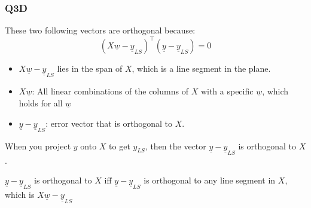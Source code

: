 \subsubsection{Q3D}
\begin{intuition}
    These two following vectors are orthogonal because:
    \[
    (X\underline{w} - \underline{y}_{LS})^\top (\underline{y} - \underline{y}_{LS}) = 0
    \]
    \begin{itemize}
        \item $X\underline{w} - \underline{y}_{LS}$ lies in the span of $X$, which is a line segment in the plane. 
        \item $X\underline{w}$: All linear combinations of the columns of $X$ with a specific $\underline{w}$, which holds for all $\underline{w}$
        \item $\underline{y} - \underline{y}_{LS}$: error vector that is orthogonal to $X$. 
    \end{itemize}
    \vspace{1em}

    When you project $y$ onto $X$ to get $y_{LS}$, then the vector $\underline{y} - \underline{y}_{LS}$ is orthogonal to $X$. 
    \vspace{1em}

    $\underline{y} - \underline{y}_{LS}$ is orthogonal to $X$ iff $\underline{y} - \underline{y}_{LS}$ is orthogonal to any line segment in $X$, which is $X\underline{w} - \underline{y}_{LS}$

\end{intuition}
